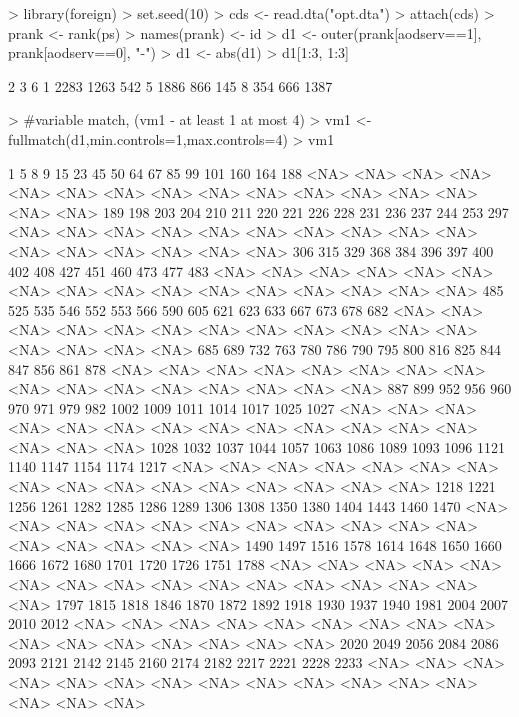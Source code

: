 \documentclass{article}
\begin{document}
\begin{Schunk}
\begin{Sinput}
> library(foreign)
> set.seed(10)
> cds <- read.dta("opt.dta")
> attach(cds)
> prank <- rank(ps)
> names(prank) <- id
> d1 <- outer(prank[aodserv==1], prank[aodserv==0], "-")
> d1 <- abs(d1)
> d1[1:3, 1:3] 
\end{Sinput}
\begin{Soutput}
     2    3    6
1 2283 1263  542
5 1886  866  145
8  354  666 1387
\end{Soutput}
\begin{Sinput}
> #variable match, (vm1 - at least 1 at most 4)
> vm1 <- fullmatch(d1,min.controls=1,max.controls=4)
> vm1
\end{Sinput}
\begin{Soutput}
   1    5    8    9   15   23   45   50   64   67   85   99  101  160  164  188 
<NA> <NA> <NA> <NA> <NA> <NA> <NA> <NA> <NA> <NA> <NA> <NA> <NA> <NA> <NA> <NA> 
 189  198  203  204  210  211  220  221  226  228  231  236  237  244  253  297 
<NA> <NA> <NA> <NA> <NA> <NA> <NA> <NA> <NA> <NA> <NA> <NA> <NA> <NA> <NA> <NA> 
 306  315  329  368  384  396  397  400  402  408  427  451  460  473  477  483 
<NA> <NA> <NA> <NA> <NA> <NA> <NA> <NA> <NA> <NA> <NA> <NA> <NA> <NA> <NA> <NA> 
 485  525  535  546  552  553  566  590  605  621  623  633  667  673  678  682 
<NA> <NA> <NA> <NA> <NA> <NA> <NA> <NA> <NA> <NA> <NA> <NA> <NA> <NA> <NA> <NA> 
 685  689  732  763  780  786  790  795  800  816  825  844  847  856  861  878 
<NA> <NA> <NA> <NA> <NA> <NA> <NA> <NA> <NA> <NA> <NA> <NA> <NA> <NA> <NA> <NA> 
 887  899  952  956  960  970  971  979  982 1002 1009 1011 1014 1017 1025 1027 
<NA> <NA> <NA> <NA> <NA> <NA> <NA> <NA> <NA> <NA> <NA> <NA> <NA> <NA> <NA> <NA> 
1028 1032 1037 1044 1057 1063 1086 1089 1093 1096 1121 1140 1147 1154 1174 1217 
<NA> <NA> <NA> <NA> <NA> <NA> <NA> <NA> <NA> <NA> <NA> <NA> <NA> <NA> <NA> <NA> 
1218 1221 1256 1261 1282 1285 1286 1289 1306 1308 1350 1380 1404 1443 1460 1470 
<NA> <NA> <NA> <NA> <NA> <NA> <NA> <NA> <NA> <NA> <NA> <NA> <NA> <NA> <NA> <NA> 
1490 1497 1516 1578 1614 1648 1650 1660 1666 1672 1680 1701 1720 1726 1751 1788 
<NA> <NA> <NA> <NA> <NA> <NA> <NA> <NA> <NA> <NA> <NA> <NA> <NA> <NA> <NA> <NA> 
1797 1815 1818 1846 1870 1872 1892 1918 1930 1937 1940 1981 2004 2007 2010 2012 
<NA> <NA> <NA> <NA> <NA> <NA> <NA> <NA> <NA> <NA> <NA> <NA> <NA> <NA> <NA> <NA> 
2020 2049 2056 2084 2086 2093 2121 2142 2145 2160 2174 2182 2217 2221 2228 2233 
<NA> <NA> <NA> <NA> <NA> <NA> <NA> <NA> <NA> <NA> <NA> <NA> <NA> <NA> <NA> <NA> 

\end{Soutput}
\end{Schunk}
\end{document}
